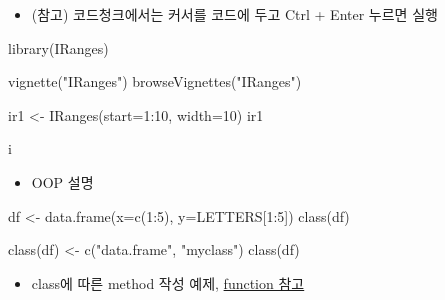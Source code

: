 \documentclass[
]{book}
\newenvironment{Shaded}{\begin{snugshade}}{\end{snugshade}}
\newcommand{\AttributeTok}[1]{\textcolor[rgb]{0.77,0.63,0.00}{#1}}
\newcommand{\DecValTok}[1]{\textcolor[rgb]{0.00,0.00,0.81}{#1}}
\newcommand{\FunctionTok}[1]{\textcolor[rgb]{0.00,0.00,0.00}{#1}}
\newcommand{\NormalTok}[1]{#1}
\newcommand{\OtherTok}[1]{\textcolor[rgb]{0.56,0.35,0.01}{#1}}
\newcommand{\SpecialCharTok}[1]{\textcolor[rgb]{0.00,0.00,0.00}{#1}}
\newcommand{\StringTok}[1]{\textcolor[rgb]{0.31,0.60,0.02}{#1}}
\providecommand{\tightlist}{%
  \setlength{\itemsep}{0pt}\setlength{\parskip}{0pt}}
\begin{document}
\begin{itemize}
\tightlist
\item
  (참고) 코드청크에서는 커서를 코드에 두고 Ctrl + Enter 누르면 실행
\end{itemize}

\begin{Shaded}
\begin{Highlighting}[]
\FunctionTok{library}\NormalTok{(IRanges)}

\FunctionTok{vignette}\NormalTok{(}\StringTok{"IRanges"}\NormalTok{)}
\FunctionTok{browseVignettes}\NormalTok{(}\StringTok{"IRanges"}\NormalTok{)}

\NormalTok{ir1 }\OtherTok{\textless{}{-}} \FunctionTok{IRanges}\NormalTok{(}\AttributeTok{start=}\DecValTok{1}\SpecialCharTok{:}\DecValTok{10}\NormalTok{, }\AttributeTok{width=}\DecValTok{10}\NormalTok{)}
\NormalTok{ir1}

\NormalTok{i}
\end{Highlighting}
\end{Shaded}

\begin{itemize}
\tightlist
\item
  OOP 설명
\end{itemize}

\begin{Shaded}
\begin{Highlighting}[]

\NormalTok{df }\OtherTok{\textless{}{-}} \FunctionTok{data.frame}\NormalTok{(}\AttributeTok{x=}\FunctionTok{c}\NormalTok{(}\DecValTok{1}\SpecialCharTok{:}\DecValTok{5}\NormalTok{), }\AttributeTok{y=}\NormalTok{LETTERS[}\DecValTok{1}\SpecialCharTok{:}\DecValTok{5}\NormalTok{])}
\FunctionTok{class}\NormalTok{(df)}

\FunctionTok{class}\NormalTok{(df) }\OtherTok{\textless{}{-}} \FunctionTok{c}\NormalTok{(}\StringTok{"data.frame"}\NormalTok{, }\StringTok{"myclass"}\NormalTok{)}
\FunctionTok{class}\NormalTok{(df)}
\end{Highlighting}
\end{Shaded}

\begin{itemize}
\tightlist
\item
  class에 따른 method 작성 예제, \href{https://greendaygh.github.io/kribbr2022/r-programming.html\#functions}{function 참고}
\end{itemize}
\end{document}
